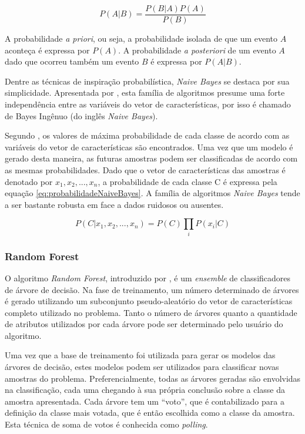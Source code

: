 \begin{equation}
	\displaystyle P(A|B) = \frac{P(B|A) P(A)}{P(B)}
\label{eq:teoremaDeBayes}
\end{equation}

A probabilidade \textit{a priori}, ou seja, a probabilidade isolada de que um evento $A$ aconteça é expressa por $P(A)$. A probabilidade \textit{a posteriori} de um evento $A$ dado que ocorreu também um evento $B$ é expressa por $P(A|B)$.

Dentre as técnicas de inspiração probabilística, \textit{Naive Bayes} se destaca por sua simplicidade. Apresentada por , esta família de algoritmos presume uma forte independência entre as variáveis do vetor de características, por isso é chamado de Bayes Ingênuo (do inglês \textit{Naive Bayes}).

Segundo , os valores de máxima probabilidade de cada classe de acordo com as variáveis do vetor de características são encontrados. Uma vez que um modelo é gerado desta maneira, as futuras amostras podem ser classificadas de acordo com as mesmas probabilidades. Dado que o vetor de características das amostras é denotado por $x_1, x_2,...,x_n$, a probabilidade de cada classe C é expressa pela equação \ref{eq:probabilidadeNaiveBayes}. A família de algoritmos \textit{Naive Bayes} tende a ser bastante robusta em face a dados ruidosos ou ausentes.

\begin{equation}
	\displaystyle P(C|x_1,x_2,...,x_n) = P(C) \prod_{i}{P(x_i|C)}
\label{eq:probabilidadeNaiveBayes}
\end{equation}

\subsubsection*{Random Forest}

O algoritmo \textit{Random Forest}, introduzido por  , é um \textit{ensemble} de classificadores de árvore de decisão. Na fase de treinamento, um número determinado de árvores é gerado utilizando um subconjunto pseudo-aleatório do vetor de características completo utilizado no problema. Tanto o número de árvores quanto a quantidade de atributos utilizados por cada árvore pode ser determinado pelo usuário do algoritmo.

Uma vez que a base de treinamento foi utilizada para gerar os modelos das árvores de decisão, estes modelos podem ser utilizados para classificar novas amostras do problema. Preferencialmente, todas as árvores geradas são envolvidas na classificação, cada uma chegando à sua própria conclusão sobre a classe da amostra apresentada. Cada árvore tem um ``voto'', que é contabilizado para a definição da classe mais votada, que é então escolhida como a classe da amostra. Esta técnica de soma de votos é conhecida como \textit{polling}.

